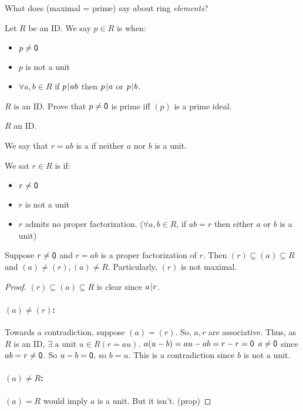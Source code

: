 \documentclass[notes.tex]{subfiles}
\begin{document}
What does (maximal = prime) say about ring \emph{elements}?

\begin{defn}
	Let $R$ be an ID. We say $p\in R$ is  when:
	\begin{itemize}
		\item $p\ne\mathsf{0}$
		\item $p$ is not a unit
		\item $\forall a,b\in R$ if $p\mkern2mu|\mkern1mu ab$ then $p\mkern2mu|\mkern1mu a$ or $p\mkern2mu|\mkern1mu b$.
	\end{itemize}
\end{defn}

\begin{exercise}
	$R$ is an ID. Prove that $p\ne\mathsf{0}$ is prime iff $(p)$ is a prime ideal.
\end{exercise}

$R$ an ID.

\begin{defn}
	We say that $r=ab$ is a  if neither $a$ nor $b$ is a unit.
\end{defn}

\begin{defn}
	We sat $r\in R$ is  if:
	\begin{itemize}
		\item $r\ne\mathsf{0}$
		\item $r$ is not a unit
		\item $r$ admits no proper factorization.
		($\forall a,b\in R$, if $ab = r$ then either $a$ or $b$ is a unit)
	\end{itemize}
\end{defn}

\begin{proposition}
	Suppose $r\ne\mathsf{0}$ and $r=ab$ is a proper factorization of $r$. Then $(r)\subseteq (a)\subseteq R$ and $(a) \ne (r), (a)\ne R$.
	Particularly, $(r)$ is not maximal.
\end{proposition}
\begin{proof}
	$(r)\subseteq (a)\subseteq R$ is clear since $a\mkern2mu|\mkern1mu r$.

	\paragraph{$(a)\ne (r)$:} Towards a contradiction, suppose $(a) = (r)$. So, $a,r$ are associative. Thus, as $R$ is an ID, $\exists \text{ a unit } u\in R (r=au)$.
	$a(u-b) = au-ab = r-r=\mathsf{0}$
	$a\ne \mathsf{0}$ since $ab = r \ne \mathsf{0}$. So $u-b = \mathsf{0},$ so $b=u$. This is a contradiction since $b$ is not a unit.

	\paragraph{$(a)\ne R$:} $(a) = R$ would imply $a$ is a unit. But it isn't. 
	\qedhere(prop)
\end{proof}
\end{document}
